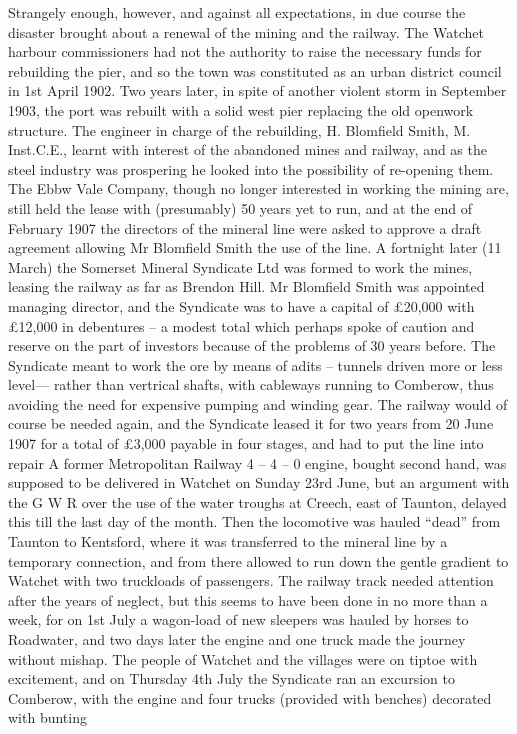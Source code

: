 \documentclass[11pt]{book}
\begin{document}
  Strangely enough, however, and against all expectations, in due course the disaster brought about a renewal of the mining and the railway. The Watchet harbour commissioners had not the authority to raise the necessary funds for rebuilding the pier, and so the town was constituted as an urban district council in 1st April 1902. Two years later, in spite of another violent storm in September 1903, the port was rebuilt with a solid west pier replacing the old openwork structure.  The engineer in charge of the rebuilding, H. Blomfield Smith, M. Inst.C.E., learnt with interest of the abandoned mines and railway, and as the steel industry was prospering he looked into the possibility of re-opening them.  The Ebbw Vale Company, though no longer interested in working the mining are, still held the lease with (presumably) 50 years yet to run, and at the end of  February 1907 the directors of the mineral line were asked to approve a draft agreement allowing Mr Blomfield Smith the use of the line. A fortnight later (11 March) the Somerset Mineral Syndicate Ltd was formed to work the mines, leasing the railway as far as Brendon Hill. Mr Blomfield Smith was appointed managing director, and the Syndicate was to have a capital of £20,000 with £12,000 in debentures – a modest total which perhaps spoke of caution and reserve on the part of investors because of the problems of 30 years before.                                                                                                                                     
     The Syndicate meant to work the ore by means of adits – tunnels driven more or less level--- rather than vertrical shafts,  with cableways running to Comberow, thus avoiding the need for expensive pumping and winding gear. The railway would of course be needed again, and the Syndicate  leased it for two years from  20 June 1907 for a total of £3,000 payable in four stages, and had to put the line into repair  
      A former Metropolitan Railway 4 – 4 – 0 engine, bought second hand, was supposed to be delivered in Watchet on Sunday 23rd June, but an argument with the G W R over the use of the water troughs at Creech, east of Taunton, delayed this till the last day of the month. Then the locomotive was hauled “dead” from Taunton to Kentsford, where it was transferred to the mineral line by a temporary connection, and from there allowed to run down the gentle gradient to Watchet with two truckloads of passengers. The railway track needed attention after the years of neglect, but this seems to have been done in no more than a week, for on 1st July a wagon-load of new sleepers was hauled by horses to Roadwater, and two days later the engine and one truck made the journey without mishap. The people of Watchet and the villages were on tiptoe with excitement, and on Thursday 4th July the Syndicate ran an excursion to Comberow, with the engine and four trucks (provided with benches) decorated with bunting
\end{document}
